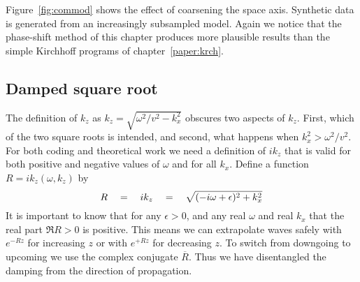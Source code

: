 Figure~\ref{fig:commod} shows the effect of coarsening the space axis.
Synthetic data is generated from an increasingly subsampled model.
Again we notice that the phase-shift method of this chapter
produces more plausible results than
the simple Kirchhoff programs of chapter~\ref{paper:krch}.



\subsection{Damped square root}
The definition of $k_z$ as $k_z=\sqrt{\omega^2/v^2 - k_x^2}$
obscures two aspects of $k_z$.
First, which of the two square roots is intended,
and second, what happens when $k_x^2 > \omega^2/v^2$.
For both coding and theoretical work we
need a definition of $ik_z$ that is valid
for both positive and negative values of $\omega$
and for all $k_x$.
Define a function $R=ik_z(\omega,k_z)$ by
\begin{equation}
        R \quad =\quad ik_z \quad =\quad
        \sqrt{(-i \omega + \epsilon)^2+k_x^2}
\end{equation}
It is important to know that for any $\epsilon >0$,
and any real $\omega$ and  real $k_x$ that
the real part $\Re R>0$ is positive.
This means we can extrapolate waves safely
with $e^{-Rz}$ for increasing $z$ or
with $e^{+Rz}$ for decreasing $z$.
To switch from downgoing to upcoming we use
the complex conjugate $\overline{R}$.
Thus we have disentangled the damping from the direction of propagation.

